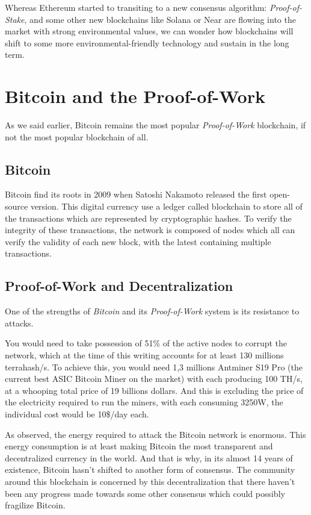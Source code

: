 \documentclass{ifacconf}
\begin{document}
Whereas Ethereum started to transiting to a new consensus algorithm: \textit{Proof-of-Stake}, and some other new blockchains like Solana or Near are flowing into the market with strong environmental values, we can wonder how blockchains will shift to some more environmental-friendly technology and sustain in the long term.


\section{Bitcoin and the Proof-of-Work}

As we said earlier, Bitcoin remains the most popular \textit{Proof-of-Work} blockchain, if not the most popular blockchain of all. 

\subsection{Bitcoin}

Bitcoin find its roots in 2009 when Satoshi Nakamoto released the first open-source version. This digital currency use a ledger called blockchain to store all of the transactions which are represented by cryptographic hashes. To verify the integrity of these transactions, the network is composed of nodes which all can verify the validity of each new block, with the latest containing multiple transactions.

\subsection{Proof-of-Work and Decentralization}

One of the strengths of \textit{Bitcoin} and its \textit{Proof-of-Work} system is its resistance to attacks. 
\begin{pf}  
You would need to take possession of 51\% of the active nodes to corrupt the network, which at the time of this writing accounts for at least 130 millions terrahash/s. To achieve this, you would need 1,3 millions Antminer S19 Pro (the current best ASIC Bitcoin Miner on the market) with each producing 100 TH/s, at a whooping total price of 19 billions dollars. And this is excluding the price of the electricity required to run the miners, with each consuming 3250W, the individual cost would be 10\$/day each.
\end{pf}

As observed, the energy required to attack the Bitcoin network is enormous.
This energy consumption is at least making Bitcoin the most transparent and decentralized currency in the world. And that is why, in its almost 14 years of existence, Bitcoin hasn't shifted to another form of consensus. The community around this blockchain is concerned by this decentralization that there haven't been any progress made towards some other consensus which could possibly fragilize Bitcoin.
\end{document}
